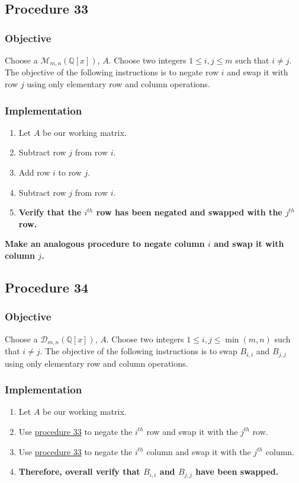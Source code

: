 \documentclass[twocolumn]{article}
\begin{document}
		\subsection{Procedure 33}\label{sec:procedure 33}
			\subsubsection{Objective}
				Choose a $\mathcal{M}_{m,n}(\mathbb{Q}[x])$, $A$. Choose two integers $1\le i,j\le m$ such that $i\ne j$. The objective of the following instructions is to negate row $i$ and swap it with row $j$ using only elementary row and column operations.
			\subsubsection{Implementation}
				\begin{enumerate}
					\item Let $A$ be our working matrix.
					\item Subtract row $j$ from row $i$.
					\item Add row $i$ to row $j$.
					\item Subtract row $j$ from row $i$.
					\item \textbf{Verify that the $i^{th}$ row has been negated and swapped with the $j^{th}$ row.}
				\end{enumerate}
		\textbf{Make an analogous procedure to negate column $i$ and swap it with column $j$.}
		\subsection{Procedure 34}\label{sec:procedure 34}
			\subsubsection{Objective}
				Choose a $\mathcal{D}_{m,n}(\mathbb{Q}[x])$, $A$. Choose two integers $1\le i,j\le\min(m,n)$ such that $i\ne j$. The objective of the following instructions is to swap $B_{i,i}$ and $B_{j,j}$ using only elementary row and column operations.
			\subsubsection{Implementation}
				\begin{enumerate}
					\item Let $A$ be our working matrix.
					\item Use \hyperref[sec:procedure 33]{procedure 33} to negate the $i^{th}$ row and swap it with the $j^{th}$ row.
					\item Use \hyperref[sec:procedure 33]{procedure 33} to negate the $i^{th}$ column and swap it with the $j^{th}$ column.
					\item \textbf{Therefore, overall verify that $B_{i,i}$ and $B_{j,j}$ have been swapped.}
				\end{enumerate}
\end{document}
